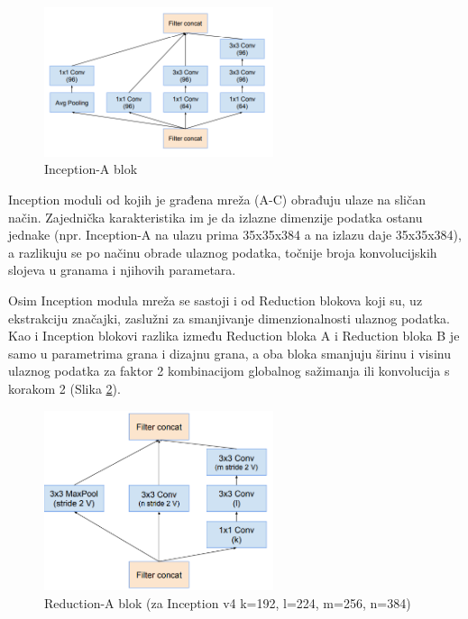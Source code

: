 \documentclass[times, utf8, proizvoljni, numeric]{fer}
\begin{document}
\begin{figure}[H]
	\begin{center}
		\captionsetup{justification=centering}
		\includegraphics[width=0.6\textwidth]{./imgs/inception_blok_a.png}
		\caption{Inception-A blok  \cite{Inceptionv4}}
		\label{fg:inception_blok_a}
	\end{center}
\end{figure}

Inception moduli od kojih je građena mreža (A-C) obrađuju ulaze na sličan način. Zajednička karakteristika im je da izlazne dimenzije podatka ostanu jednake (npr. Inception-A na ulazu prima 35x35x384 a na izlazu daje 35x35x384), a razlikuju se po načinu obrade ulaznog podatka, točnije broja konvolucijskih slojeva u granama i njihovih parametara.

Osim Inception modula mreža se sastoji i od Reduction blokova koji su, uz ekstrakciju značajki, zaslužni za smanjivanje dimenzionalnosti ulaznog podatka. Kao i Inception blokovi razlika između Reduction bloka A i Reduction bloka B je samo u parametrima grana i dizajnu grana, a oba bloka smanjuju širinu i visinu ulaznog podatka za faktor 2 kombinacijom globalnog sažimanja ili konvolucija s korakom 2 (Slika \ref{fg:inception_reduction_a}).

\begin{figure}[!ht]
	\begin{center}
		\captionsetup{justification=centering}
		\includegraphics[width=0.6\textwidth]{./imgs/inception_reduction_a.png}
		\caption{Reduction-A blok (za Inception v4 k=192, l=224, m=256, n=384) \cite{Inceptionv4}}
		\label{fg:inception_reduction_a}
	\end{center}
\end{figure}
\end{document}
